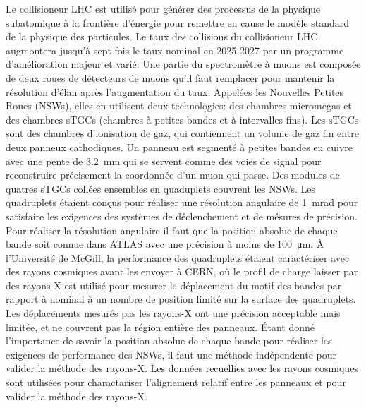 Le collisioneur LHC est utilis\'{e} pour g\'{e}n\'{e}rer des processus de la physique subatomique \`{a} la fronti\`{e}re d'\'{e}nergie pour remettre en cause le mod\`{e}le standard de la physique des particules. Le taux des collisions du collisioneur LHC augmontera jusqu'\`{a} sept fois le taux nominal en 2025-2027 par un programme d'am\'{e}lioration majeur et vari\'{e}. Une partie du spectrom\`{e}tre \`{a} muons est compos\'{e}e de deux roues de d\'{e}tecteurs de muons qu'il faut remplacer pour mantenir la r\'{e}solution d'\'{e}lan apr\`{e}s l'augmentation du taux. Appel\'{e}es les Nouvelles Petites Roues (NSWs), elles en utilisent deux technologies: des chambres micromegas et des chambres sTGCs (chambres \`{a} petites bandes et \`{a} intervalles fins). Les sTGCs sont des chambres d'ionisation de gaz, qui contiennent un volume de gaz fin entre deux panneux cathodiques. Un panneau est segment\'{e} \`{a} petites bandes en cuivre avec une pente de \SI{3.2}{mm} qui se servent comme des voies de signal pour reconstruire pr\'{e}cisement la coordonn\'{e}e d'un muon qui passe. Des modules de quatres sTGCs coll\'{e}es ensembles en quaduplets couvrent les NSWs. Les quadruplets \'{e}taient con\c{c}us pour r\'{e}aliser une r\'{e}solution angulaire de \SI{1}{mrad} pour satisfaire les exigences des syst\`{e}mes de d\'{e}clenchement et de m\'{e}sures de pr\'{e}cision. Pour r\'{e}aliser la r\'{e}solution angulaire il faut que la position absolue de chaque bande soit connue dans ATLAS avec une pr\'{e}cision \`{a} moins de \SI{100}{\micro\meter}. \`{A} l'Universit\'{e} de McGill, la performance des quadruplets \'{e}taient caract\'{e}riser avec des rayons cosmiques avant les envoyer \`{a} CERN, o\`{u} le profil de charge laisser par des rayons-X est utilis\'{e} pour mesurer le d\'{e}placement du motif des bandes par rapport \`{a} nominal \`{a} un nombre de position limit\'{e} sur la surface des quadruplets. Les d\'{e}placements mesur\'{e}s pas les rayons-X ont une pr\'{e}cision acceptable mais limit\'{e}e, et ne couvrent pas la r\'{e}gion enti\`{e}re des panneaux. \'{E}tant donn\'{e} l'importance de savoir la position absolue de chaque bande pour r\'{e}aliser les exigences de performance des NSWs, il faut une m\'{e}thode ind\'{e}pendente pour valider la m\'{e}thode des rayons-X. Les donn\'{e}es recuellies avec les rayons cosmiques sont utilis\'{e}es pour charactariser l'alignement relatif entre les panneaux et pour valider la m\'{e}thode des rayons-X.

\cleardoublepage


